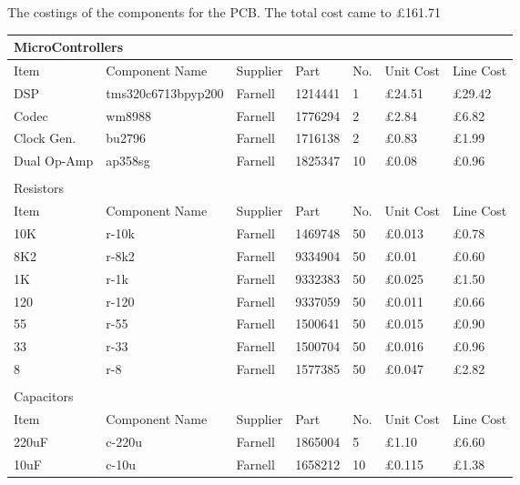 The costings of the components for the PCB.
The total cost came to \pounds161.71

\begin{table}[H]
	\centering
	\begin{tabular}[c]{| l | l | l | l | l | l | l |}
		\hline
		\multicolumn{7}{|l|}{MicroControllers} \\
		\hline
		Item	& Component Name& Supplier & Part	& No.	& Unit Cost  & Line Cost \\
		\hline
		DSP	& tms320c6713bpyp200	& Farnell	& 1214441	& 1	& \pounds24.51	& \pounds29.42	\\
		Codec	& wm8988		& Farnell	& 1776294	& 2	& \pounds2.84	& \pounds6.82	\\
		Clock Gen.	& bu2796	& Farnell	& 1716138	& 2	& \pounds0.83	& \pounds1.99	\\
		Dual Op-Amp	& ap358sg	& Farnell	& 1825347	& 10	& \pounds0.08	& \pounds0.96	\\
		\hline
		\multicolumn{7}{|l|}{}\\
		\hline
		\multicolumn{7}{|l|}{Resistors} \\
		\hline
		Item	& Component Name& Supplier & Part	& No.	& Unit Cost  & Line Cost \\
		\hline
		10K\textohm	& r-10k	& Farnell	& 1469748	& 50	& \pounds0.013	& \pounds0.78	\\
		8K2\textohm	& r-8k2	& Farnell	& 9334904	& 50	& \pounds0.01	& \pounds0.60	\\
		1K\textohm	& r-1k	& Farnell	& 9332383	& 50	& \pounds0.025	& \pounds1.50	\\
		120\textohm	& r-120	& Farnell	& 9337059	& 50	& \pounds0.011	& \pounds0.66	\\
		55\textohm	& r-55	& Farnell	& 1500641	& 50	& \pounds0.015	& \pounds0.90	\\
		33\textohm	& r-33	& Farnell	& 1500704	& 50	& \pounds0.016	& \pounds0.96	\\
		8\textohm	& r-8	& Farnell	& 1577385	& 50	& \pounds0.047	& \pounds2.82	\\
		\hline
		\multicolumn{7}{|l|}{}\\
		\hline
		\multicolumn{7}{|l|}{Capacitors} \\
		\hline
		Item	& Component Name& Supplier & Part	& No.	& Unit Cost  & Line Cost \\
		\hline
		220uF	& c-220u& Farnell	& 1865004	& 5	& \pounds1.10	& \pounds6.60	\\
		10uF	& c-10u	& Farnell	& 1658212	& 10	& \pounds0.115	& \pounds1.38	\\

\end{tabular}
\end{table}
